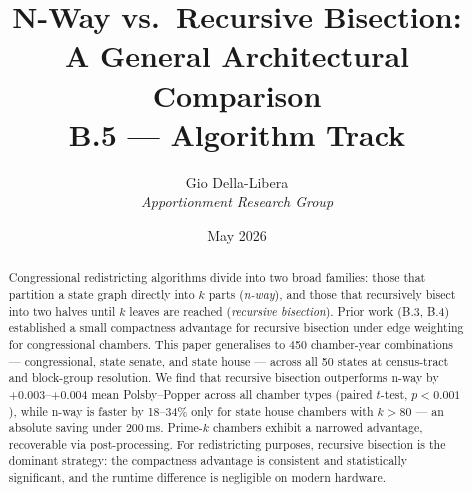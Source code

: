 \documentclass[12pt]{article}
\title{\textbf{N-Way vs.\ Recursive Bisection:\\
A General Architectural Comparison}\\[0.4em]
\large B.5 --- Algorithm Track}
\author{Gio Della-Libera \\ \textit{Apportionment Research Group}}
\date{May 2026}
\begin{document}
\maketitle

\begin{abstract}
Congressional redistricting algorithms divide into two broad families:
those that partition a state graph directly into $k$ parts (\emph{n-way}),
and those that recursively bisect into two halves until $k$ leaves are
reached (\emph{recursive bisection}).
Prior work (B.3, B.4) established a small compactness advantage for recursive
bisection under edge weighting for congressional chambers.
This paper generalises to 450 chamber-year combinations --- congressional,
state senate, and state house --- across all 50 states at census-tract and
block-group resolution.
We find that recursive bisection outperforms n-way by $+0.003$--$+0.004$
mean Polsby--Popper across all chamber types (paired $t$-test, $p < 0.001$),
while n-way is faster by 18--34\% only for state house chambers with
$k > 80$ --- an absolute saving under 200\,ms.
Prime-$k$ chambers exhibit a narrowed advantage, recoverable via
post-processing.
For redistricting purposes, recursive bisection is the dominant strategy:
the compactness advantage is consistent and statistically significant, and
the runtime difference is negligible on modern hardware.
\end{abstract}










\end{document}
